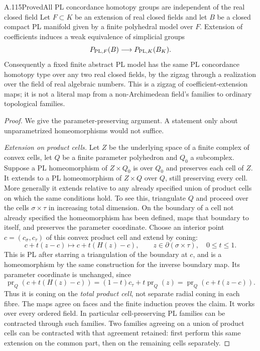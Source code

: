 \begin{saresult}{A.115}{Proved}{All PL concordance homotopy groups are independent of the real closed field}
Let $F\subset K$ be an extension of real closed fields and let $B$
be a closed compact PL manifold given by a finite polyhedral model
over $F$. Extension of coefficients induces a weak equivalence
of simplicial groups
\[
 P_{{\rm PL},F}(B)\longrightarrow P_{{\rm PL},K}(B_K).
\]
Consequently a fixed finite abstract PL model has the same PL
concordance homotopy type over any two real closed fields, by the
zigzag through a realization over the field of real algebraic
numbers. This is a zigzag of coefficient-extension maps; it is
not a literal map from a non-Archimedean field's families to
ordinary topological families.
\end{saresult}
\begin{proof}
We give the parameter-preserving argument. A statement only about
unparametrized homeomorphisms would not suffice.

\emph{Extension on product cells.}
Let $Z$ be the underlying space of a finite complex of convex
cells, let $Q$ be a finite parameter polyhedron and $Q_0$ a
subcomplex. Suppose a PL homeomorphism of $Z\times Q_0$ is over
$Q_0$ and preserves each cell of $Z$. It extends to a PL
homeomorphism of $Z\times Q$ over $Q$, still preserving every
cell. More generally it extends relative to any already
specified union of product cells on which the same conditions hold.
To see this, triangulate $Q$ and proceed over the cells
$\sigma\times\tau$ in increasing total dimension. On the boundary
of a cell not already specified the homeomorphism has been
defined, maps that boundary to itself, and preserves the parameter
coordinate. Choose an interior point
$c=(c_\sigma,c_\tau)$ of this convex product cell and extend
by coning:
\[
 c+t(z-c)\longmapsto c+t(H(z)-c),
 \qquad z\in\partial(\sigma\times\tau),\quad 0\le t\le1.
\]
This is PL after starring a triangulation of the boundary at
$c$, and is a homeomorphism by the same construction for the
inverse boundary map. Its parameter coordinate is unchanged,
since
\[
 \operatorname{pr}_Q(c+t(H(z)-c))
 =(1-t)c_\tau+t\operatorname{pr}_Q(z)
 =\operatorname{pr}_Q(c+t(z-c)).
\]
Thus it is coning on the \emph{total product cell}, not separate
radial coning in each fibre. The maps agree on faces and the
finite induction proves the claim. It works over every ordered
field. In particular cell-preserving PL families can be contracted
through such families. Two families agreeing on a union of
product cells can be contracted with that agreement retained:
first perform this same extension on the common part, then on
the remaining cells separately.


\end{proof}
